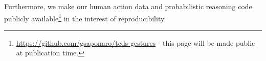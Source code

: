 Furthermore, we make our human action data and probabilistic reasoning code publicly available\footnote{\url{https://github.com/gsaponaro/tcds-gestures} - this page will be made public at publication time.} in the interest of reproducibility.


